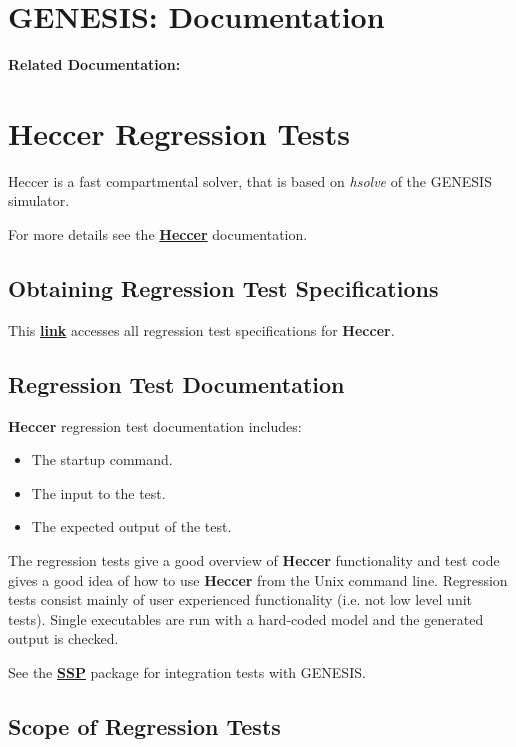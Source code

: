 \documentclass[12pt]{article}
\begin{document}
\section*{GENESIS: Documentation}

{\bf Related Documentation:}

\section*{Heccer Regression Tests}

Heccer is a fast compartmental solver, that is based on {\it hsolve} of the GENESIS simulator.

For more details see the \href{../heccer/heccer.tex}{\bf Heccer} documentation.

\subsection*{Obtaining Regression Test Specifications}

This \href{http://www.neurospaces.org/neurospaces_project/heccer/tests/html/index.html}{\bf link} accesses all regression test specifications for {\bf Heccer}.

\subsection*{Regression Test Documentation}

{\bf Heccer} regression test documentation includes:
\begin{itemize}
\item The startup command.
\item The input to the test.
\item The expected output of the test.
\end{itemize}
The regression tests give a good overview of {\bf Heccer} functionality and test code gives a good idea of how to use {\bf Heccer} from the Unix command line. Regression tests consist mainly of user experienced functionality (i.e. not low level unit tests). Single executables are run with a hard-coded model and the generated output is checked.

See the \href{../ssp/ssp.tex}{\bf SSP} package for integration tests with GENESIS.

\subsection*{Scope of Regression Tests}
\end{document}
